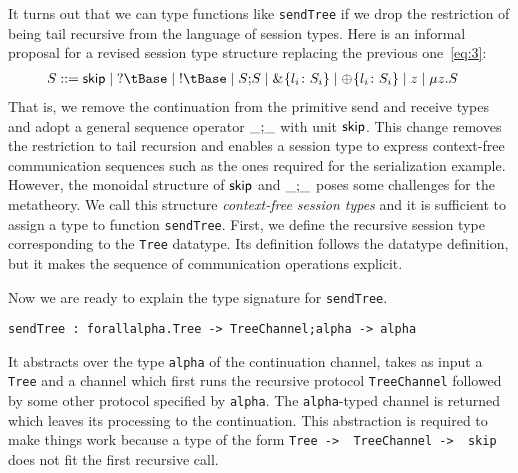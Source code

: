 It turns out that we can type functions like \lstinline|sendTree| if we drop the
restriction of being tail recursive from the language of session
types. Here is an informal proposal for a revised session type structure
replacing the previous one~\eqref{eq:3}:
%
\begin{align*}
  \SE & ::=  \skipk \mid \scRecv\tBase \mid \scSend\tBase \mid
        \scCompose\SE\SE \mid
        \sRecvChoice{\cgAlt{\LL_i}{\SE_i}} \mid \sSendChoice{\cgAlt{\LL_i}{\SE_i}} \mid 
        \sVar \mid \sMu\sVar\SE
\end{align*}
%
That is, we remove the continuation from the primitive send and
receive types and adopt a general sequence operator $\_{;}\_$
with unit $\mathsf{skip}$. This change removes the restriction to tail
recursion and enables a session type to express context-free
communication sequences such as the ones required for the
serialization example. However, the monoidal structure of
$\mathsf{skip}$ and $\_{;}\_$ poses some challenges for the metatheory.  We
call this structure \emph{context-free session types} and it is
sufficient to assign a type to function \lstinline|sendTree|. First,
we define the recursive session type corresponding to the \lstinline|Tree|
datatype. Its definition follows the datatype definition, but
it makes the sequence of communication operations explicit.

Now we are ready to explain the type signature for \lstinline|sendTree|.
\begin{lstlisting}
sendTree : forallalpha.Tree -> TreeChannel;alpha -> alpha
\end{lstlisting}
It abstracts over the type \lstinline|alpha| of the continuation
channel, takes as input a \lstinline|Tree| and a channel which first
runs the recursive  protocol \lstinline{TreeChannel} followed by some other
protocol specified by \lstinline|alpha|. The \lstinline|alpha|-typed
channel is returned which leaves its processing to the continuation.
%
This abstraction is required to make things work because a type of the form \lstinline|Tree ->  TreeChannel ->  skip|
does not fit the first recursive call.

